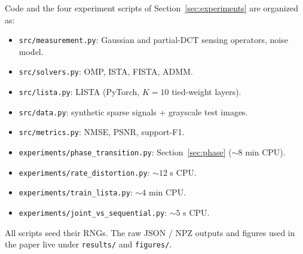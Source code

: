 \documentclass{article}
\begin{document}
Code and the four experiment scripts of Section~\ref{sec:experiments} are organized as:
\begin{itemize}[topsep=0pt,itemsep=0pt]
\item \texttt{src/measurement.py}: Gaussian and partial-DCT sensing operators, noise model.
\item \texttt{src/solvers.py}: OMP, ISTA, FISTA, ADMM.
\item \texttt{src/lista.py}: LISTA (PyTorch, $K{=}10$ tied-weight layers).
\item \texttt{src/data.py}: synthetic sparse signals + grayscale test images.
\item \texttt{src/metrics.py}: NMSE, PSNR, support-F1.
\item \texttt{experiments/phase\_transition.py}: Section~\ref{sec:phase} ($\sim 8$ min CPU).
\item \texttt{experiments/rate\_distortion.py}: $\sim 12$ s CPU.
\item \texttt{experiments/train\_lista.py}: $\sim 4$ min CPU.
\item \texttt{experiments/joint\_vs\_sequential.py}: $\sim 5$ s CPU.
\end{itemize}
All scripts seed their RNGs. The raw JSON / NPZ outputs and figures used in the paper live under \texttt{results/} and \texttt{figures/}.


% 
\end{document}
